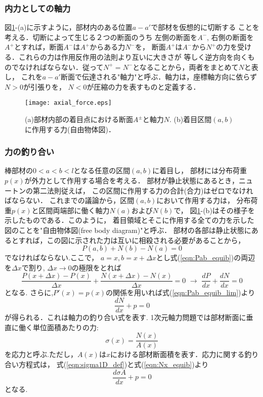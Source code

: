 \documentclass[10pt,a4j]{jarticle}
\begin{document}
\subsubsection{内力としての軸力}
図\ref{fig:defN}-(a)に示すように，部材内のある位置$a-a'$で部材を仮想的に切断する
ことを考える．切断によって生じる２つの断面のうち
左側の断面を$A^-$, 右側の断面を$A^+$とすれば，断面$A^−$は$A^+$からある力$N^-$を，
断面$A^+$は$A^-$から$N^+$の力を受ける．これらの力は作用反作用の法則より互いに大きさが
等しく逆方向を向くものでなければならない．従って$N^+=N^-$となることから，両者をまとめて$N$と表し，
これを$a-a'$断面で伝達される"軸力"と呼ぶ．軸力は，座標軸方向に依らず$N>0$が引張りを，
$N<0$が圧縮の力を表すものと定義する．
\begin{figure}[h]
	\begin{center}
	\texttt{[image: axial\_force.eps]} 
	\end{center}
	\caption{(a)部材内部の着目点における断面$A^{\pm}$と軸力$N$.
	(b)着目区間$(a,b)$に作用する力(自由物体図)．} 
	\label{fig:defN}
\end{figure}
\subsubsection{力の釣り合い}
棒部材の$0<a<b<l$となる任意の区間$(a,b)$に着目し，
部材には分布荷重$p(x)$が外力として作用する場合を考える．
部材が静止状態にあるとき，ニュートンの第二法則従えば，
この区間に作用する力の合計(合力)はゼロでなければならない．
これまでの議論から，区間$(a,b)$において作用する力は，
分布荷重$p(x)$と区間両端部に働く軸力$N(a)$および$N(b)$で，
図\ref{fig:defN}-(b)はその様子を示したものである．このように，
着目領域とそこに作用する全ての力を示した図のことを"自由物体図(free body diagram)"と呼ぶ．
部材の各部は静止状態にあるとすれば，この図に示された力は互いに相殺される必要があることから，
\begin{equation}
	P(a,b)+N(b)-N(a)=0
	\label{eqn:Pab_equib}
\end{equation}
でなければならない.ここで，
$a=x, b=x+\Delta x$とし式(\ref{eqn:Pab_equib})の両辺を$\Delta x$で割り, 
$\Delta x\rightarrow 0$の極限をとれば
\begin{equation}
	\frac{P(x+\Delta x)-P(x)}{\Delta x}+\frac{N(x+\Delta x)-N(x)}{\Delta x}=0 \,\,
	\rightarrow
	\, \,
	\frac{dP}{dx}+\frac{dN}{dx}=0
	\label{eqn:Pab_equib_lim}
\end{equation}
となる. さらに,$P'(x)=p(x)$の関係を用いれば式(\ref{eqn:Pab_equib_lim})より
\begin{equation}
	\frac{dN}{dx}+p=0
	\label{eqn:Nx_equib}
\end{equation}
が得られる．これは軸力の釣り合い式を表す. 
1次元軸力問題では部材断面に垂直に働く単位面積あたりの力:
\begin{equation}
	\sigma(x) = \frac{N(x)}{A(x)}
	\label{eqn:sigma1D_def}
\end{equation}
を応力と呼ぶ.ただし，$A(x)$は$x$における部材断面積を表す．応力に関する釣り合い方程式は，
式(\ref{eqn:sigma1D_def})と式(\ref{eqn:Nx_equib})より
\begin{equation}
	\frac{d\sigma A}{dx}+p=0
	\label{eqn:sigx_equib}
\end{equation}
となる.
\end{document}
